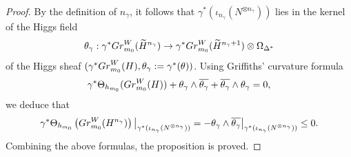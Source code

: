 \documentclass[10pt,a4paper]{amsart}
\begin{document}
\begin{proof}
		By the definition of $n_\gamma$, it follows that $\gamma^\ast(\iota_{n_\gamma}(N^{\otimes n_\gamma}))$ lies in the kernel of the Higgs field  
		$$  
		\theta_\gamma: \gamma^\ast {\rm Gr}^W_{m_0}(\widetilde{H}^{n_\gamma}) \to \gamma^\ast {\rm Gr}^W_{m_0}(\widetilde{H}^{n_\gamma+1}) \otimes \Omega_{\Delta^\ast}  
		$$  
		of the Higgs sheaf $(\gamma^\ast{\rm Gr}^W_{m_0}(H), \theta_\gamma := \gamma^\ast(\theta))$.  		
		Using Griffiths' curvature formula  
		$$  
		\gamma^\ast \Theta_{h_{m_0}}({\rm Gr}^W_{m_0}(H)) + \theta_\gamma \wedge \overline{\theta_\gamma} + \overline{\theta_\gamma} \wedge \theta_\gamma = 0,  
		$$  
		we deduce that  
		$$  
		\gamma^\ast \Theta_{h_{m_0}}\left({\rm Gr}^W_{m_0}(H^{n_\gamma})\right)\big|_{\gamma^\ast(\iota_{n_\gamma}(N^{\otimes n_\gamma}))} = -\theta_\gamma \wedge \overline{\theta_\gamma}\big|_{\gamma^\ast(\iota_{n_\gamma}(N^{\otimes n_\gamma}))} \leq 0.  
		$$  		
		Combining the above formulas, the proposition is proved.  
	\end{proof}
\end{document}
